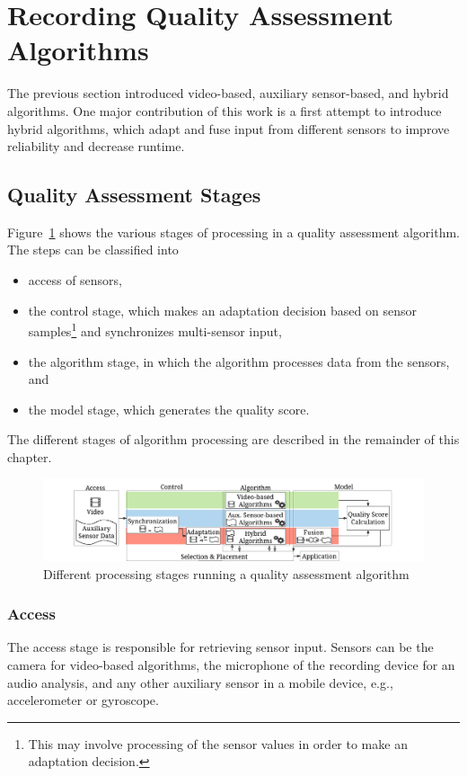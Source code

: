 \section{Recording Quality Assessment Algorithms}
\label{sec:554_quality_assessment}
The previous section introduced video-based, auxiliary sensor-based, and hybrid algorithms. 
One major contribution of this work is a first attempt to introduce hybrid algorithms, which adapt and fuse input from different sensors to improve reliability and decrease runtime.
\subsection{Quality Assessment Stages}
\label{sec:554_QA_Algorithms}
Figure~\ref{fig:554_Overview_Stages_crop} shows the various stages of processing in a quality assessment algorithm.
The steps can be classified into
\begin{itemize}
\item access of sensors, 
\item the control stage, which makes an adaptation decision based on sensor samples\footnote{This may involve processing of the sensor values in order to make an adaptation decision.} and synchronizes multi-sensor input, 
\item the algorithm stage, in which the algorithm processes data from the sensors, and 
\item the model stage, which generates the quality score.
\end{itemize} 
The different stages of algorithm processing are described in the remainder of this chapter.
\begin{figure}[!htb]
\centering
\includegraphics[width=\linewidth]{./gfx/550_QA/Overview_Stages_crop}
\caption{Different processing stages running a quality assessment algorithm}
\label{fig:554_Overview_Stages_crop}
\end{figure}
\subsubsection{Access}
The access stage is responsible for retrieving sensor input. Sensors can be the camera for video-based algorithms, the microphone of the recording device for an audio analysis, and any other auxiliary sensor in a mobile device, e.g., accelerometer or gyroscope.

